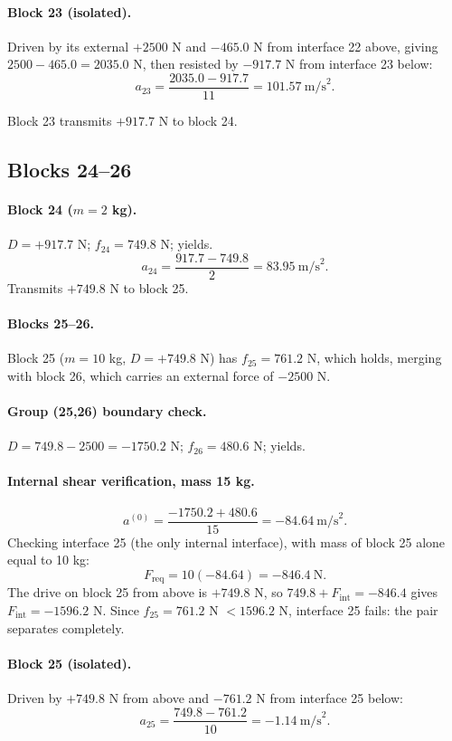 \documentclass[11pt,a4paper]{article}
\begin{document}
\paragraph{Block 23 (isolated).} Driven by its external $+2500$ N and $-465.0$ N from interface 22 above, giving $2500-465.0=2035.0$ N, then resisted by $-917.7$ N from interface 23 below:
\[
a_{23} = \frac{2035.0-917.7}{11} = 101.57\ \text{m/s}^2 .
\]

Block 23 transmits $+917.7$ N to block 24.

\subsection{Blocks 24--26}

\paragraph{Block 24 ($m=2$ kg).} $D=+917.7$ N; $f_{24}=749.8$ N; yields.
\[
a_{24} = \frac{917.7-749.8}{2} = 83.95\ \text{m/s}^2 .
\]
Transmits $+749.8$ N to block 25.

\paragraph{Blocks 25--26.} Block 25 ($m=10$ kg, $D=+749.8$ N) has $f_{25}=761.2$ N, which holds, merging with block 26, which carries an external force of $-2500$ N.

\paragraph{Group (25,26) boundary check.} $D = 749.8-2500 = -1750.2$ N; $f_{26}=480.6$ N; yields.

\paragraph{Internal shear verification, mass 15 kg.}
\[
a^{(0)} = \frac{-1750.2+480.6}{15} = -84.64\ \text{m/s}^2 .
\]
Checking interface 25 (the only internal interface), with mass of block 25 alone equal to 10 kg:
\[
F_{\mathrm{req}} = 10(-84.64) = -846.4\ \text{N}.
\]
The drive on block 25 from above is $+749.8$ N, so $749.8+F_{\mathrm{int}} = -846.4$ gives $F_{\mathrm{int}} = -1596.2$ N. Since $f_{25}=761.2$ N $< 1596.2$ N, interface 25 fails: the pair separates completely.

\paragraph{Block 25 (isolated).} Driven by $+749.8$ N from above and $-761.2$ N from interface 25 below:
\[
a_{25} = \frac{749.8-761.2}{10} = -1.14\ \text{m/s}^2 .
\]
\end{document}
